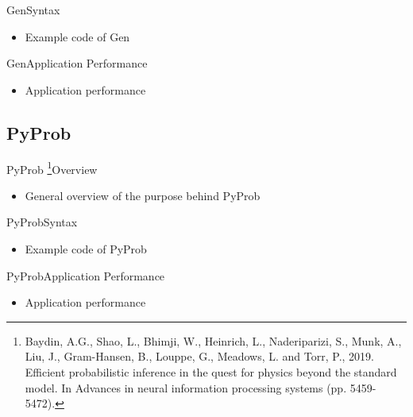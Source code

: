 \documentclass[AERbeamer%
              ,optEnglish%
              ,optBiber%
              ,optBibstyleAlphabetic%
              ,optBeamerClassicFormat%
              ]{AERlatex}%
\begin{document}
\begin{frame}[c]{Gen}{Syntax}
    \centering
    \begin{itemize}
        \item Example code of Gen
    \end{itemize}
\end{frame}


\begin{frame}[c]{Gen}{Application Performance}
    \centering
    \begin{itemize}
        \item Application performance
    \end{itemize}
\end{frame}


\subsection{PyProb}
\begin{frame}[c]{PyProb \footnote{Baydin, A.G., Shao, L., Bhimji, W., Heinrich, L., Naderiparizi, S., Munk, A., Liu, J., Gram-Hansen, B.,
                                  Louppe, G., Meadows, L. and Torr, P., 2019. Efficient probabilistic inference in the quest for physics
                                  beyond the standard model. In Advances in neural information processing systems (pp. 5459-5472).}}{Overview}
    \centering
    \begin{itemize}
        \item General overview of the purpose behind PyProb
    \end{itemize}
\end{frame}


\begin{frame}[c]{PyProb}{Syntax}
    \centering
    \begin{itemize}
        \item Example code of PyProb
    \end{itemize}
\end{frame}


\begin{frame}[c]{PyProb}{Application Performance}
    \centering
    \begin{itemize}
        \item Application performance
    \end{itemize}
\end{frame}
\end{document}
